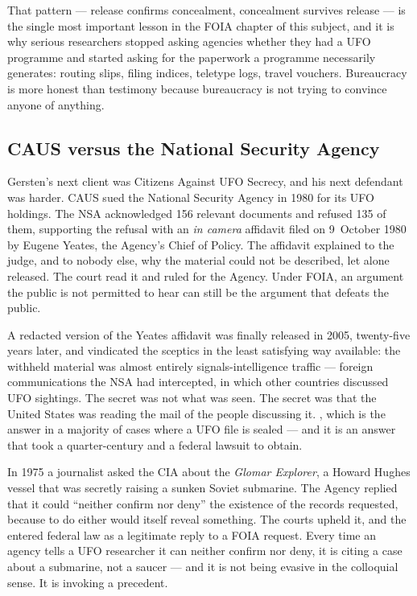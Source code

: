 That pattern --- release confirms concealment, concealment survives release --- is the single most
important lesson in the FOIA chapter of this subject, and it is why serious researchers stopped
asking agencies whether they had a UFO programme and started asking for the paperwork a programme
necessarily generates: routing slips, filing indices, teletype logs, travel vouchers. Bureaucracy is
more honest than testimony because bureaucracy is not trying to convince anyone of anything.

\subsection{CAUS versus the National Security Agency}\label{sec:causnsa}

Gersten's next client was Citizens Against UFO Secrecy, and his next defendant was harder. CAUS sued
the National Security Agency in 1980 for its UFO holdings. The NSA acknowledged 156 relevant
documents and refused 135 of them, supporting the refusal with an \emph{in camera} affidavit filed on
9~October 1980 by Eugene Yeates, the Agency's Chief of Policy. The affidavit explained to the judge,
and to nobody else, why the material could not be described, let alone released. The court read it
and ruled for the Agency. Under FOIA, an argument the public is not permitted to hear can still be
the argument that defeats the public.

A redacted version of the Yeates affidavit was finally released in 2005, twenty-five years later, and
vindicated the sceptics in the least satisfying way available: the withheld material was almost
entirely signals-intelligence traffic --- foreign communications the NSA had intercepted, in which
other countries discussed UFO sightings. The secret was not what was seen. The secret was that the
United States was reading the mail of the people discussing it. , which is the answer in a majority of cases where a UFO file is
sealed --- and it is an answer that took a quarter-century and a federal lawsuit to obtain.

\begin{funfact}
In 1975 a journalist asked the CIA about the \emph{Glomar Explorer}, a Howard Hughes vessel that was
secretly raising a sunken Soviet submarine. The Agency replied that it could ``neither confirm nor
deny'' the existence of the records requested, because to do either would itself reveal something.
The courts upheld it, and the  entered federal law as a legitimate reply to a
FOIA request. Every time an agency tells a UFO researcher it can neither confirm nor deny, it is
citing a case about a submarine, not a saucer --- and it is not being evasive in the colloquial
sense. It is invoking a precedent.
\end{funfact}

